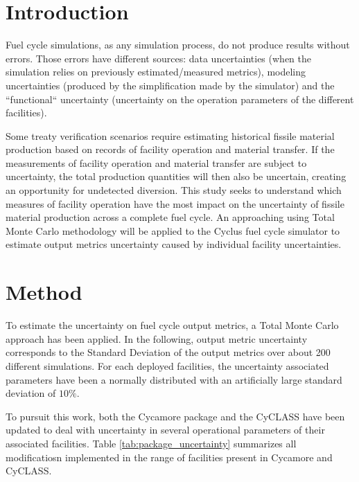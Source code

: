 \documentclass{anstrans}
\title{}
\author{Baptiste Mouginot,$^{*}$ Kathryn Mummah,$^{*}$ Paul P.H. Wilson$^{*}$}
\institute{
$^{*}$University of Wisconsin-Madison, WI
}
\begin{document}
\section{Introduction}

Fuel cycle simulations, as any simulation process, do not produce results
without errors. Those errors have different sources: data uncertainties (when
the simulation relies on previously estimated/measured metrics), modeling
uncertainties (produced by the simplification made by the simulator) and the
``functional`` uncertainty (uncertainty on the operation parameters of the
different facilities).

Some treaty verification scenarios require estimating historical fissile
material production based on records of facility operation and material
transfer.  If the measurements of facility operation and material transfer are
subject to uncertainty, the total production quantities will then also be
uncertain, creating an opportunity for undetected diversion.  This study seeks
to understand which measures of facility operation have the most impact on the
uncertainty of fissile material production across a complete fuel cycle.  An
approaching using Total Monte Carlo methodology will be applied to the Cyclus
fuel cycle simulator
\cite{cyclus} to estimate output metrics uncertainty caused by individual
facility uncertainties.


\section{Method}

To estimate the uncertainty on fuel cycle output metrics, a Total Monte
Carlo approach has been applied. In the following, output metric uncertainty
corresponds to the Standard Deviation of the output metrics over about 200
different simulations. For each deployed facilities, the uncertainty associated
parameters have been a normally distributed with an artificially large standard
deviation of $10\%$.

To pursuit this work, both the Cycamore\cite{cycamore} package and the
CyCLASS\cite{cyclass} have been updated to deal with uncertainty in several
operational parameters of their associated facilities.  Table
\ref{tab:package_uncertainty} summarizes all modificatiosn implemented in the
range of facilities present in Cycamore and CyCLASS.
\end{document}
